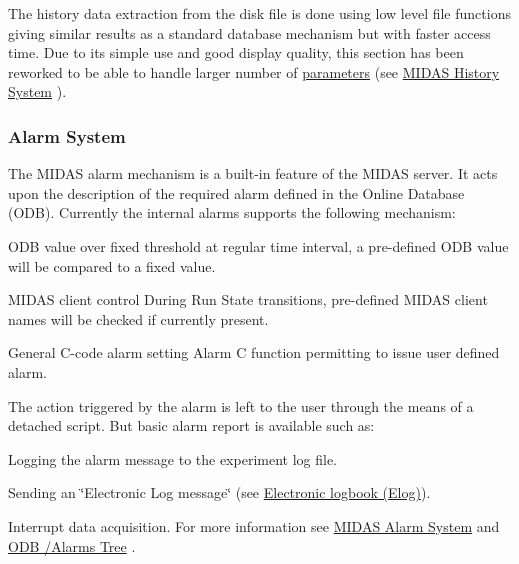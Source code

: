 The history data extraction from the disk file is done using low level file functions giving similar results as a standard database mechanism but with faster access time. Due to its simple use and good display quality, this section has been reworked to be able to handle larger number of \hyperlink{structparameters}{parameters} (see \hyperlink{F_History_logging_F_History_System}{MIDAS History System} ).

\label{F_MainElements_idx_alarm_system_overview}
\hypertarget{F_MainElements_idx_alarm_system_overview}{}
 \hypertarget{F_MainElements_F_Alarm_System_overview}{}\subsubsection{Alarm System}\label{F_MainElements_F_Alarm_System_overview}
The MIDAS alarm mechanism is a built-\/in feature of the MIDAS server. It acts upon the description of the required alarm defined in the Online Database (ODB). Currently the internal alarms supports the following mechanism:
\begin{DoxyItemize}
\item ODB value over fixed threshold at regular time interval, a pre-\/defined ODB value will be compared to a fixed value.
\item MIDAS client control During Run State transitions, pre-\/defined MIDAS client names will be checked if currently present.
\item General C-\/code alarm setting Alarm C function permitting to issue user defined alarm.
\end{DoxyItemize}

The action triggered by the alarm is left to the user through the means of a detached script. But basic alarm report is available such as:
\begin{DoxyItemize}
\item Logging the alarm message to the experiment log file.
\item Sending an \char`\"{}Electronic Log message\char`\"{} (see \hyperlink{F_Elog}{Electronic logbook (Elog)}).
\item Interrupt data acquisition. For more information see \hyperlink{RC_customize_ODB_RC_Alarm_System}{MIDAS Alarm System} and \hyperlink{RC_customize_ODB_RC_ODB_Alarms_Tree}{ODB /Alarms Tree} .
\end{DoxyItemize}

